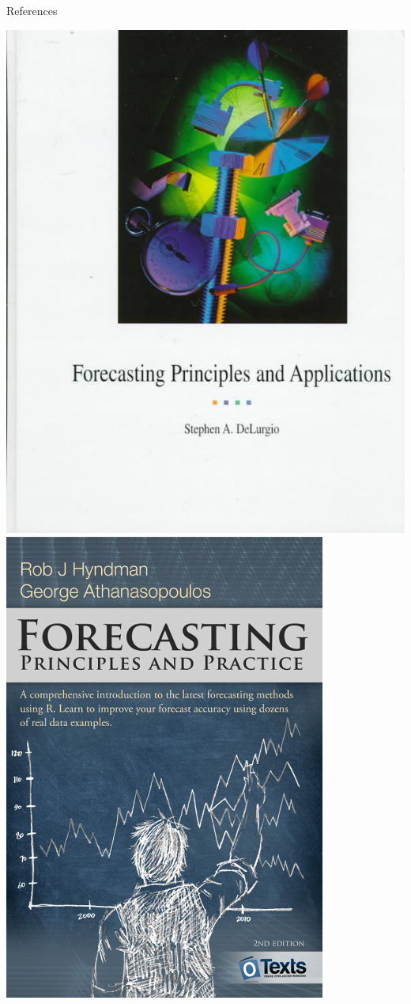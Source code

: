 \documentclass[12pt,aspectratio=169]{beamer}
\begin{document}
\begin{frame}{References}
    \begin{center}
        \includegraphics[height=0.8\textheight]{figures/delurgio}
        \hspace{2em}
        \includegraphics[height=0.8\textheight]{figures/fpp2}
    \end{center}
\end{frame}
\end{document}
